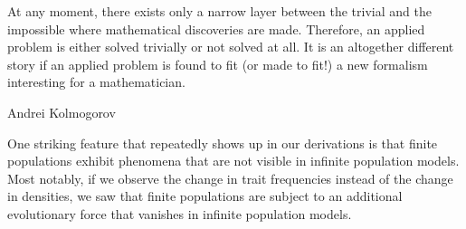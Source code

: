 \epigraph{\justifying At any moment, there exists only a narrow layer between the trivial and the impossible where mathematical discoveries are made. Therefore, an applied problem is either solved trivially or not solved at all. It is an altogether different story if an
applied problem is found to fit (or made to fit!) a new formalism interesting for a mathematician.}{Andrei Kolmogorov}

One striking feature that repeatedly shows up in our derivations is that finite populations exhibit phenomena that are not visible in infinite population models. 
Most notably, if we observe the change in trait frequencies instead of the change in densities, we saw that finite populations are subject to an additional evolutionary force that vanishes in infinite population models.
